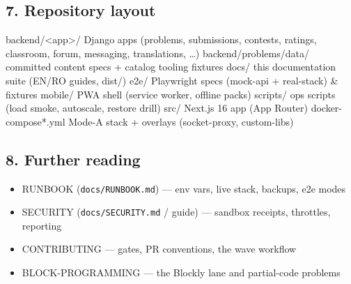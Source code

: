 \documentclass[
]{article}
\newenvironment{Shaded}{}{}
\newcommand{\NormalTok}[1]{#1}
\providecommand{\tightlist}{%
  \setlength{\itemsep}{0pt}\setlength{\parskip}{0pt}}
\begin{document}
\subsection{7. Repository layout}\label{7-repository-layout}

\begin{Shaded}
\begin{Highlighting}[]
\NormalTok{backend/\textless{}app\textgreater{}/         Django apps (problems, submissions, contests, ratings,}
\NormalTok{                       classroom, forum, messaging, translations, …)}
\NormalTok{backend/problems/data/ committed content specs + catalog tooling fixtures}
\NormalTok{docs/                  this documentation suite (EN/RO guides, dist/)}
\NormalTok{e2e/                   Playwright specs (mock{-}api + real{-}stack) \& fixtures}
\NormalTok{mobile/                PWA shell (service worker, offline packs)}
\NormalTok{scripts/               ops scripts (load smoke, autoscale, restore drill)}
\NormalTok{src/                   Next.js 16 app (App Router)}
\NormalTok{docker{-}compose*.yml    Mode{-}A stack + overlays (socket{-}proxy, custom{-}libs)}
\end{Highlighting}
\end{Shaded}

\subsection{8. Further reading}\label{8-further-reading}

\begin{itemize}
\tightlist
\item
  RUNBOOK (\texttt{docs/RUNBOOK.md}) --- env vars, live stack, backups,
  e2e modes
\item
  SECURITY (\texttt{docs/SECURITY.md} / guide) --- sandbox receipts,
  throttles, reporting
\item
  CONTRIBUTING --- gates, PR conventions, the wave workflow
\item
  BLOCK-PROGRAMMING --- the Blockly lane and partial-code problems
\end{itemize}
\end{document}
